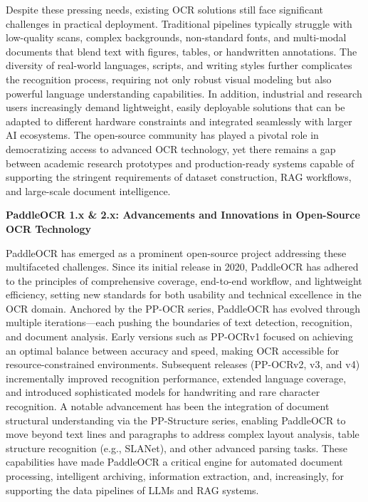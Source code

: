 \documentclass[11pt, a4paper, logo, copyright, nonumbering]{paddleocr}
\begin{document}
Despite these pressing needs, existing OCR solutions still face significant challenges in practical deployment. Traditional pipelines typically struggle with low-quality scans, complex backgrounds, non-standard fonts, and multi-modal documents that blend text with figures, tables, or handwritten annotations. The diversity of real-world languages, scripts, and writing styles further complicates the recognition process, requiring not only robust visual modeling but also powerful language understanding capabilities. In addition, industrial and research users increasingly demand lightweight, easily deployable solutions that can be adapted to different hardware constraints and integrated seamlessly with larger AI ecosystems. The open-source community has played a pivotal role in democratizing access to advanced OCR technology, yet there remains a gap between academic research prototypes and production-ready systems capable of supporting the stringent requirements of dataset construction, RAG workflows, and large-scale document intelligence.

\textbf{PaddleOCR 1.x \& 2.x: Advancements and Innovations in Open-Source OCR Technology}

PaddleOCR has emerged as a prominent open-source project addressing these multifaceted challenges. Since its initial release in 2020, PaddleOCR has adhered to the principles of comprehensive coverage, end-to-end workflow, and lightweight efficiency, setting new standards for both usability and technical excellence in the OCR domain. Anchored by the PP-OCR series, PaddleOCR has evolved through multiple iterations---each pushing the boundaries of text detection, recognition, and document analysis. Early versions such as PP-OCRv1\citep{du2020pp} focused on achieving an optimal balance between accuracy and speed, making OCR accessible for resource-constrained environments. Subsequent releases (PP-OCRv2\citep{du2021pp}, v3\citep{li2022pp}, and v4) incrementally improved recognition performance, extended language coverage, and introduced sophisticated models for handwriting and rare character recognition. A notable advancement has been the integration of document structural understanding via the PP-Structure series, enabling PaddleOCR to move beyond text lines and paragraphs to address complex layout analysis, table structure recognition (e.g., SLANet\citep{li2022ppstructurev2}), and other advanced parsing tasks. These capabilities have made PaddleOCR a critical engine for automated document processing, intelligent archiving, information extraction, and, increasingly, for supporting the data pipelines of LLMs and RAG systems.
\end{document}
